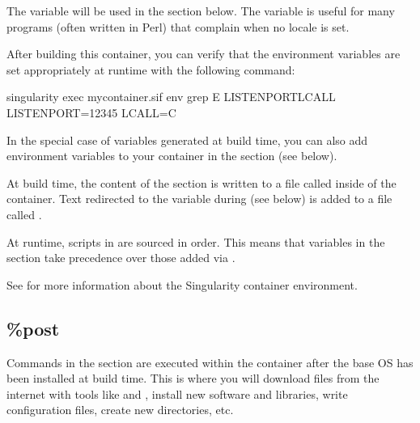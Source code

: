 \documentclass[letterpaper,10pt,english]{sphinxmanual}
\begin{document}
The  variable will be used in the  section
below. The  variable is useful for many programs (often written in
Perl) that complain when no locale is set.

After building this container, you can verify that the environment variables are
set appropriately at runtime with the following command:

%
\begin{sphinxVerbatim}[commandchars=\\\{\}]
\PYGZdl{} singularity exec my\PYGZus{}container.sif env \textbar{} grep \PYGZhy{}E \PYGZsq{}LISTEN\PYGZus{}PORT\textbar{}LC\PYGZus{}ALL\PYGZsq{}
LISTEN\PYGZus{}PORT=12345
LC\PYGZus{}ALL=C
\end{sphinxVerbatim}

In the special case of variables generated at build time, you can also add
environment variables to your container in the  section (see below).

At build time, the content of the  section is written to a file
called  inside of the container.  Text
redirected to the  variable during  (see
below) is added to a file called .

At runtime, scripts in  are sourced in order. This means
that variables in the  section take precedence over those added  via
.

See  for more
information about the Singularity container environment.


\subsection{\%post}
\label{\detokenize{definition_files:post}}
Commands in the  section are executed within the container after the
base OS has been installed at build time. This is where you will download files
from the internet with tools like  and , install new software and
libraries, write configuration files, create new directories, etc.
\end{document}
